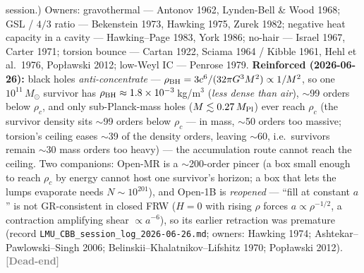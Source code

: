 \documentclass[11pt]{article}
\newcommand{\dead}{\textcolor{gray}{\textbf{[Dead-end]}}}
\newcommand{\msun}{M_\odot}
\begin{document}
session.) Owners: gravothermal --- Antonov 1962, Lynden-Bell \& Wood 1968; GSL / $4/3$ ratio --- Bekenstein 1973, Hawking 1975, Zurek 1982; negative heat capacity in a cavity --- Hawking--Page 1983, York 1986; no-hair --- Israel 1967, Carter 1971; torsion bounce --- Cartan 1922, Sciama 1964 / Kibble 1961, Hehl et al.\ 1976, Pop\l{}awski 2012; low-Weyl IC --- Penrose 1979. \textbf{Reinforced (2026-06-26):} black holes \emph{anti-concentrate} --- $\rho_{\rm BH}=3c^6/(32\pi G^3M^2)\propto1/M^2$, so one $10^{11}\,\msun$ survivor has $\rho_{\rm BH}\approx1.8\times10^{-3}$\,kg/m$^3$ (\emph{less dense than air}), $\sim$99 orders below $\rho_c$, and only sub-Planck-mass holes ($M\lesssim0.27\,M_{\rm Pl}$) ever reach $\rho_c$ (the survivor density sits $\sim$99 orders below $\rho_c$ --- in mass, $\sim$50 orders too massive; torsion's ceiling eases $\sim$39 of the density orders, leaving $\sim$60, i.e.\ survivors remain $\sim$30 mass orders too heavy) --- the accumulation route cannot reach the ceiling. Two companions: Open-MR is a $\sim$200-order pincer (a box small enough to reach $\rho_c$ by energy cannot host one survivor's horizon; a box that lets the lumps evaporate needs $N\sim10^{201}$), and Open-1B is \emph{reopened} --- ``fill at constant $a$'' is not GR-consistent in closed FRW ($H{=}0$ with rising $\rho$ forces $a\propto\rho^{-1/2}$, a contraction amplifying shear $\propto a^{-6}$), so its earlier retraction was premature (record \texttt{LMU\_CBB\_session\_log\_2026-06-26.md}; owners: Hawking 1974; Ashtekar--Pawlowski--Singh 2006; Belinskii--Khalatnikov--Lifshitz 1970; Pop\l{}awski 2012). \dead\quad
\end{document}
